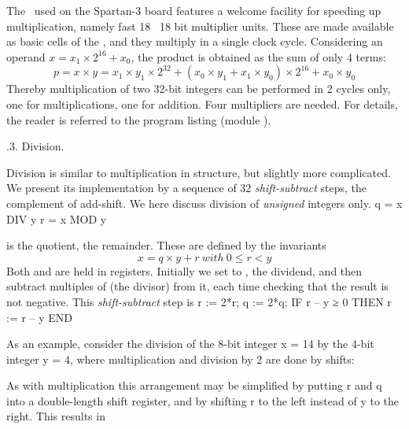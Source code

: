 {The \FPGA\ used on the Spartan-3 board features a welcome facility for speeding up multiplication, namely fast 18 \times\ 18 bit multiplier units. These are made available as basic cells of the \FPGA, and they multiply in a single clock cycle. Considering an operand $x = x_1 \times 2^{16} + x_0$, the product is obtained as the sum of only 4 terms:
$$p = x \times y = x_1 \times y_1 \times 2^{32} + (x_0 \times y_1 + x_1 \times y_0) \times 2^{16} + x_0 \times y_0$$
\noindent Thereby multiplication of two 32-bit integers can be performed in 2 cycles only, one for multiplications, one for addition. Four multipliers are needed. For details, the reader is referred to the program listing (module ).

.3. Division.

Division is similar to multiplication in structure, but slightly more complicated. We present its implementation by a sequence of 32 \emph{shift-subtract} steps, the complement of add-shift. We here discuss division of \emph{unsigned} integers only.
\begintt
q = x DIV y
r = x MOD y
\endtt

\noindent {} is the quotient,  the remainder. These are defined by the invariants
$$x = q \times y + r\ with\ 0 \le r < y$$
\noindent Both  and  are held in registers. Initially we set  to , the dividend, and then subtract multiples of  (the divisor) from it, each time checking that the result is not negative. This \emph{shift-subtract} step is
\begintt
r := 2*r; q := 2*q;
IF r – y ≥ 0 THEN r := r – y END
\endtt

\noindent As an example, consider the division of the 8-bit integer x = 14 by the 4-bit integer y = 4, where multiplication and division by 2 are done by shifts:

\medskip
{}\medskip

\noindent As with multiplication this arrangement may be simplified by putting r and q into a double-length shift register, and by shifting r to the left instead of y to the right. This results in

}
